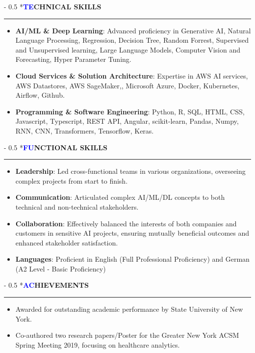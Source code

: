 \documentclass{article}
\makeatletter
\renewcommand{\section}{\@startsection{section}{1}{0mm}%
                                {-\baselineskip}%
                                {0.5\baselineskip}%
                                {\normalfont\small\bfseries}}
\makeatother
\begin{document}
\section*{{\textbf{\textcolor{blue}{TE}}\textbf{\textcolor{darktext}{CHNICAL SKILLS}}}}
\hrule
\begin{itemize}[left=0pt]
\item \textbf{AI/ML \& Deep Learning}: Advanced proficiency in Generative AI, Natural Language Processing, Regression, Decision Tree, Random Forrest, Supervised and Unsupervised learning, Large Language Models, Computer Vision and Forecasting, Hyper Parameter Tuning. %
\item \textbf{Cloud Services \& Solution Architecture}: Expertise in AWS AI services, AWS Datastores, AWS SageMaker,, Microsoft Azure, Docker,  Kubernetes, Airflow, Github. 
\item \textbf{Programming \& Software Engineering}: Python, R, SQL, HTML, CSS, Javascript, Typescript, REST API, Angular, scikit-learn, Pandas, Numpy, RNN, CNN, Transformers, Tensorflow, Keras.%
\end{itemize}

\section*{{\textbf{\textcolor{blue}{FU}}\textbf{\textcolor{darktext}{NCTIONAL SKILLS}}}}
\hrule
\begin{itemize}[left=0pt]
\item \textbf{Leadership}: Led cross-functional teams in various organizations, overseeing complex projects from start to finish.
\item \textbf{Communication}: Articulated complex AI/ML/DL concepts to both technical and non-technical stakeholders.
\item \textbf{Collaboration}: Effectively balanced the interests of both companies and customers in sensitive AI projects, ensuring mutually beneficial outcomes and enhanced stakeholder satisfaction. 
\item \textbf{Languages}: Proficient in English (Full Professional Proficiency) and German (A2 Level - Basic Proficiency)
\end{itemize}

\section*{{\textbf{\textcolor{blue}{AC}}\textbf{\textcolor{darktext}{HIEVEMENTS}}}}
\hrule
\begin{itemize}[left=0pt]
\item Awarded for outstanding academic performance by State University of New York.
\item Co-authored two research papers/Poster for the Greater New York ACSM Spring Meeting 2019, focusing on healthcare analytics.
\end{itemize} 
\end{document}
